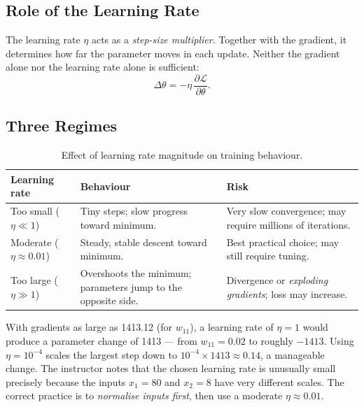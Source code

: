 \documentclass[12pt,a4paper]{article}
\newcommand{\Loss}{\mathcal{L}}
\newcommand{\pderiv}[2]{\dfrac{\partial #1}{\partial #2}}
\begin{document}
\subsection{Role of the Learning Rate}

The learning rate $\eta$ acts as a \emph{step-size multiplier}.
Together with the gradient, it determines how far the parameter moves in each
update.
Neither the gradient alone nor the learning rate alone is sufficient:
\begin{equation}
  \Delta\theta = -\eta\,\pderiv{\Loss}{\theta}.
  \label{eq:step}
\end{equation}

\subsection{Three Regimes}

\begin{table}[ht]
\centering
\caption{Effect of learning rate magnitude on training behaviour.}
\label{tab:lr-effects}
\begin{tabular}{p{2.5cm}p{4.5cm}p{5.5cm}}
\toprule
\textbf{Learning rate} & \textbf{Behaviour} & \textbf{Risk} \\
\midrule
Too small
  ($\eta \ll 1$) &
  Tiny steps; slow progress toward minimum. &
  Very slow convergence; may require millions of iterations. \\[6pt]
Moderate
  ($\eta \approx 0.01$) &
  Steady, stable descent toward minimum. &
  Best practical choice; may still require tuning. \\[6pt]
Too large
  ($\eta \gg 1$) &
  Overshoots the minimum; parameters jump to the opposite side. &
  Divergence or \emph{exploding gradients}; loss may increase. \\
\bottomrule
\end{tabular}
\end{table}

\begin{example}[Why $\eta = 10^{-4}$ was chosen in this session]
With gradients as large as 1413.12 (for $w_{11}$), a learning rate of
$\eta = 1$ would produce a parameter change of 1413 --- from $w_{11}=0.02$
to roughly $-1413$.
Using $\eta = 10^{-4}$ scales the largest step down to
$10^{-4} \times 1413 \approx 0.14$, a manageable change.
The instructor notes that the chosen learning rate is unusually small
precisely because the inputs $x_1=80$ and $x_2=8$ have very different scales.
The correct practice is to \emph{normalise inputs first}, then use a
moderate $\eta \approx 0.01$.
\end{example}
\end{document}
